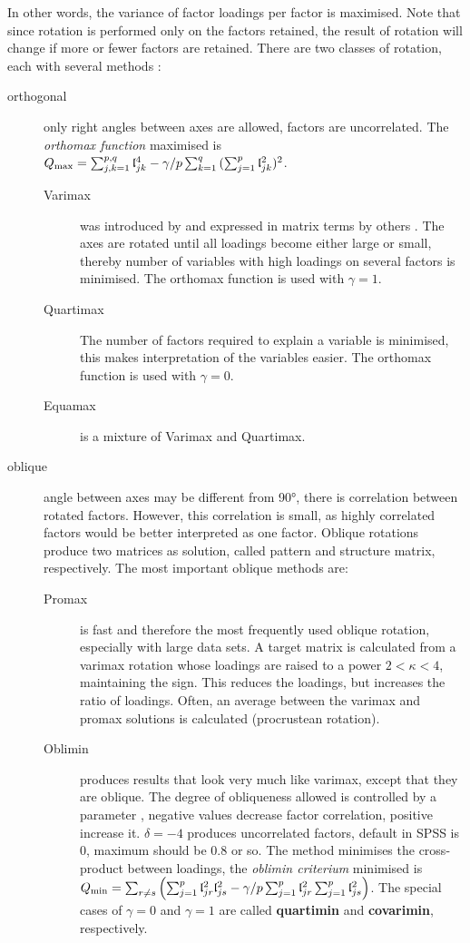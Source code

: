 In other words, the variance of factor loadings per factor is maximised. Note that since rotation is performed only on the factors retained, the result of rotation will change if more or fewer factors are retained. There are two classes of rotation, each with several methods \parencite{Kie-98,Abd-03,Cla-88}:
\begin{description}
  \item[orthogonal]{only right angles between axes are allowed, factors are uncorrelated. The \emph{orthomax function} maximised is \(Q_\mathrm{max}  = \sum_{j,k = 1}^{p, q}{\mathfrak{l}_{jk}^4} - \gamma/p \sum_{k=1}^q{(\sum_{j=1}^p{\mathfrak{l}_{jk}^2})^2} \).
     \begin{description}
        \item[Varimax]{was introduced by  \parencite{Kai-58,Kai-59} and expressed in matrix terms by others \parencite{She-66,Nev-86}. The axes are rotated until all loadings become either large or small, thereby number of variables with high loadings on several factors is minimised. The orthomax function is used with \(\gamma = 1 \). }
        \item[Quartimax]{The number of factors required to explain a variable is minimised, this makes interpretation of the variables easier. The orthomax function is used with \(\gamma = 0 \).}
        \item[Equamax]{is a mixture of Varimax and Quartimax.}
    \end{description} }
  \item[oblique]{angle between axes may be different from \ang{90}, there is correlation between rotated factors. However, this correlation is small, as highly correlated factors would be better interpreted as one factor. Oblique rotations produce two matrices as solution, called pattern and structure matrix, respectively. The most important oblique methods are:
    \begin{description}
        \item[Promax]{is fast and therefore the most frequently used oblique rotation, especially with large data sets. A target matrix is calculated from a varimax rotation whose loadings are raised to a power \(\num{2} < \kappa < \num{4} \), maintaining the sign. This reduces the loadings, but increases the ratio of loadings. Often, an average between the varimax and promax solutions is calculated (procrustean rotation).}
        \item[Oblimin]{produces results that look very much like varimax, except that they are oblique. The degree of obliqueness allowed is controlled by a parameter \textdelta, negative values decrease factor correlation, positive increase it. \(\delta = -4 \) produces uncorrelated factors, default in SPSS is \num{0}, maximum should be \num{0.8} or so. The method minimises the cross-product between loadings, the \emph{oblimin criterium} minimised is \(Q_\mathrm{min} = \sum_{r \neq s}{\left(\sum_{j=1}^p{\mathfrak{l}_{jr}^2\mathfrak{l}_{js}^2} - \gamma/p \sum_{j=1}^p{\mathfrak{l}_{jr}^2} \sum_{j=1}^p{\mathfrak{l}_{js}^2}\right)} \). The special cases of \(\gamma = 0 \) and \(\gamma = 1 \) are called \textbf{quartimin} and \textbf{covarimin}, respectively.}
    \end{description} }
\end{description}
